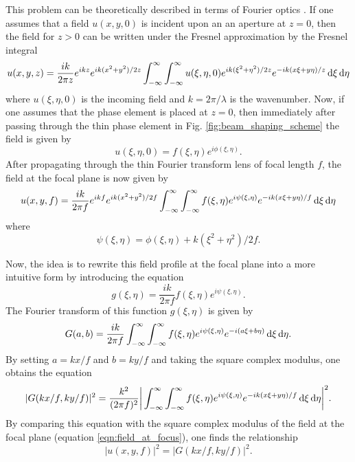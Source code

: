 This problem can be theoretically described in terms of Fourier optics \cite{dickeyLaserBeamShaping2000, romeroMathematicalAspectsLaser2010, goodmanIntroductionFourierOptics2005}.  If one assumes that a field $u(x,y,0)$ is incident upon an an aperture at $z=0$, then the field for $z>0$ can be written under the Fresnel approximation by the Fresnel integral
\begin{equation}
\label{fresnel_integral}
	u(x,y,z)=\frac{i k}{2\pi z}e^{i k z}e^{i k (x^2+y^2)/2z}\int_{-\infty}^{\infty}\int_{-\infty}^{\infty}u(\xi,\eta,0) e^{ik(\xi^{2}+\eta^{2})/2z} e^{-ik(x\xi + y\eta)/z} \mathop{}\!\mathrm{d}\xi\mathop{}\!\mathrm{d}\eta
\end{equation}
where $u(\xi,\eta,0)$ is the incoming field and $k=2\pi/\lambda$ is the wavenumber.  Now, if one assumes that the phase element is placed at $z=0$, then immediately after passing through the thin phase element in Fig. \ref{fig:beam_shaping_scheme} the field is given by
\begin{equation}
	u(\xi,\eta,0)=f(\xi,\eta)e^{i\phi(\xi,\eta)}.
\end{equation} 
After propagating through the thin Fourier transform lens of focal length $f$, the field at the focal plane is now given by
\begin{equation}
\label{eqn:field_at_focus}
	u(x,y,f)=\frac{ik}{2\pi f}e^{ikf}e^{ik(x^2+y^2)/2f}\int_{-\infty}^{\infty}\int_{-\infty}^{\infty}f(\xi,\eta)e^{i\psi(\xi,\eta)}
	e^{-ik(x\xi + y\eta)/f}\mathop{}\!\mathrm{d}\xi\mathop{}\!\mathrm{d}\eta
\end{equation}
where
\begin{equation}
	\psi(\xi,\eta)=\phi(\xi,\eta) + k(\xi^2 + \eta^2)/2f.
\end{equation}

Now, the idea is to rewrite this field profile at the focal plane into a more intuitive form by introducing the equation
\begin{equation}
	g(\xi,\eta)=\frac{ik}{2\pi f}f(\xi,\eta)e^{i\psi(\xi,\eta)}.
\end{equation}
The Fourier transform of this function $g(\xi,\eta)$ is given by
\begin{equation}
\label{eqn:big_G}
	G(a,b)=\frac{ik}{2\pi f}\int_{-\infty}^{\infty}\int_{-\infty}^{\infty}f(\xi,\eta)e^{i\psi(\xi,\eta)}
	e^{-i(a\xi + b\eta)}\mathop{}\!\mathrm{d}\xi\mathop{}\!\mathrm{d}\eta.
\end{equation}
By setting $a=kx/f$ and $b=ky/f$ and taking the square complex modulus, one obtains the equation
\begin{equation}
	\rvert G(kx/f,ky/f)\rvert^{2} = \frac{k^2}{(2\pi f)^2} \bigg\rvert\int_{-\infty}^{\infty}\int_{-\infty}^{\infty}
	f(\xi,\eta)e^{i\psi(\xi,\eta)}e^{-ik(x\xi+y\eta)/f}\mathop{}\!\mathrm{d}\xi\mathop{}\!\mathrm{d}\eta\bigg\rvert^{2}.
\end{equation}
By comparing this equation with the square complex modulus of the field at the focal plane (equation \ref{eqn:field_at_focus}), one finds the relationship
\begin{equation}
\label{eqn:Fourier_focal_plane}
	\rvert u(x,y,f)\rvert^2 = \rvert G(kx/f,ky/f)\rvert^2.
\end{equation}

